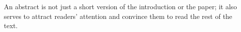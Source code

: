 An abstract is not just a short version of the introduction or the paper; 
it also serves to attract readers' attention and convince them to read the rest of the text.
